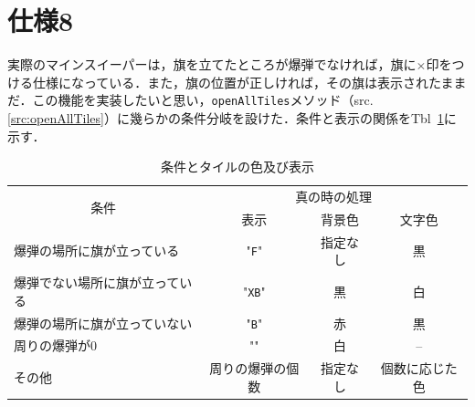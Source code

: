 \documentclass[a4j,11pt]{jsarticle}
\newcommand{\srcref}[1]{src. \ref{#1}}
\newcommand{\tabref}[1]{Tbl\ \ref{#1}}
\begin{document}
\section*{仕様8}
\setcounter{section}{8}\label{sec:仕様8}
\setcounter{subsection}{0}
実際のマインスイーパーは，旗を立てたところが爆弾でなければ，旗に\(\times\)印をつける仕様になっている．また，旗の位置が正しければ，その旗は表示されたままだ．この機能を実装したいと思い，\verb|openAllTiles|メソッド（\srcref{src:openAllTiles}）に幾らかの条件分岐を設けた．条件と表示の関係を\tabref{tbl:条件とタイルの色及び表示}に示す．
\begin{table}[h]
    \centering
    \caption{条件とタイルの色及び表示}
    \label{tbl:条件とタイルの色及び表示}
    \begin{tabular}{l|ccc}
        \hline
        \multicolumn{1}{c|}{\multirow{2}{*}{条件}} & \multicolumn{3}{c}{真の時の処理}                             \\
        \cline{2-4}
                                                   & 表示                             & 背景色   & 文字色         \\
        \hline
        爆弾の場所に旗が立っている                 & "\verb|F|"                       & 指定なし & 黒             \\
        爆弾でない場所に旗が立っている             & "\verb|XB|"                      & 黒       & 白             \\
        爆弾の場所に旗が立っていない               & "\verb|B|"                       & 赤       & 黒             \\
        周りの爆弾が0                              & ""                               & 白       & --             \\
        その他                                     & 周りの爆弾の個数                 & 指定なし & 個数に応じた色 \\
        \hline
    \end{tabular}
\end{table}
\newpage
\end{document}
